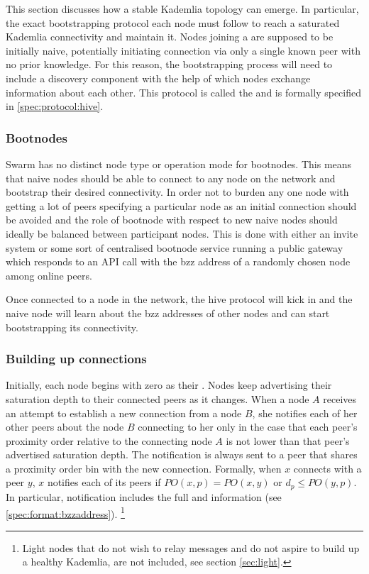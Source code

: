  
This section discusses how a stable Kademlia topology can emerge. In particular, the exact bootstrapping protocol each node must follow to reach a saturated Kademlia connectivity and maintain it. Nodes joining a  are supposed to be initially naive, potentially initiating connection via only a single known peer with no prior knowledge. For this reason, the bootstrapping process will need to include a discovery component with the help of which nodes exchange information about each other. This protocol is called the  and is formally specified in \ref{spec:protocol:hive}.

\subsubsection{Bootnodes}

Swarm has no distinct node type or operation  mode for bootnodes. This means that naive nodes should be able to connect to any node on the  network and bootstrap their desired connectivity. In order not to burden any one node with getting a lot of peers specifying a particular node as an initial connection  should be avoided and the role of bootnode with respect to new naive nodes should ideally be balanced between participant nodes. This is done with either an invite system or some sort of centralised bootnode service running a public gateway which responds to an API call with the bzz address of a randomly chosen node among online peers. 

Once connected to a node in the network, the hive protocol will kick in and the naive node will learn about the bzz addresses of other nodes and can start bootstrapping its connectivity.

\subsubsection{Building up connections}

Initially, each node begins with zero as their . Nodes keep advertising their saturation depth to their connected peers as it changes. When a node $A$ receives an attempt to establish a new connection from a node $B$, she notifies each of her other peers about the node $B$ connecting to her only in the case that each peer's proximity order relative to the connecting node $A$ is not lower than that peer's advertised saturation depth. The notification is always sent to a peer that shares a proximity order bin with the new connection. Formally, when $x$ connects with a peer $y$, $x$ notifies each of its peers if $\mathit{PO}(x, p) = \mathit{PO}(x, y)$ or $d_p\leq \mathit{PO}(y, p)$. In particular, notification includes the full  and  information (see \ref{spec:format:bzzaddress}).%
%
\footnote{Light nodes that do not wish to relay messages and do not aspire to build up a healthy Kademlia, are not included, see section \ref{sec:light}. }

